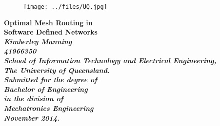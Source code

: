 \begin{titlepage}
\renewcommand{\baselinestretch}{1.0}
\begin{figure}[h]
\centering
\texttt{[image: ../files/UQ.jpg]}
\end{figure}
\begin{center}
\vspace*{35mm}
\Huge\bf
        Optimal Mesh Routing in \\
				Software Defined Networks \\
\vspace{20mm}
\large\sl
        Kimberley Manning \\
        41966350
                \bigskip\\
\rm
                School of Information Technology and Electrical Engineering,\\
                The University of Queensland.\\
\vspace{30mm}   
                Submitted for the degree of\\
                Bachelor of Engineering
                \smallskip\\
\normalsize
                in the division of\\
                Mechatronics Engineering
                \medskip\\
\large
                November 2014.
\end{center}
\end{titlepage}

\pagestyle{fancy}
\fancyfoot{}
\fancyhead{}
\renewcommand{\headrulewidth}{0pt}
\fancyfoot[C] {\footnotesize \thepage}

\cleardoublepage

